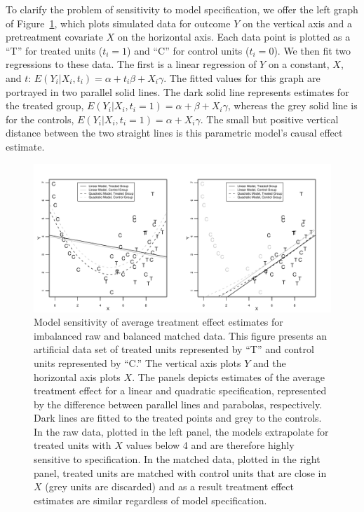 \documentclass[11pt,titlepage]{article}
\begin{document}
To clarify the problem of sensitivity to model specification, we offer
the left graph of Figure~\ref{fg:extrap}, which plots simulated data
for outcome $Y$ on the vertical axis and a pretreatment covariate $X$
on the horizontal axis.  Each data point is plotted as a ``T'' for
treated units ($t_i=1$) and ``C'' for control units ($t_i=0$).  We
then fit two regressions to these data.  The first is a linear
regression of $Y$ on a constant, $X$, and $t$: $E(Y_i|X_i,t_i)=\alpha
+ t_i\beta + X_i\gamma$.  The fitted values for this graph are
portrayed in two parallel solid lines.  The dark solid line represents
estimates for the treated group,
$E(Y_i|X_i,t_i=1)=\alpha+\beta+X_i\gamma$, whereas the grey solid line
is for the controls, $E(Y_i|X_i,t_i=1)=\alpha+X_i\gamma$. The small
but positive vertical distance between the two straight lines is this
parametric model's causal effect estimate.
\begin{figure}[t] 
 \begin{center}
   \includegraphics[width=6in]{figs/olspanel.pdf}
  \end{center}
  \vspace{-0.275in}
  \caption{Model sensitivity of average treatment effect estimates for
    imbalanced raw and balanced matched data.  This figure presents an
    artificial data set of treated units represented by ``T'' and
    control units represented by ``C.'' The vertical axis plots $Y$
    and the horizontal axis plots $X$.  The panels depicts estimates
    of the average treatment effect for a linear and quadratic
    specification, represented by the difference between parallel
    lines and parabolas, respectively.  Dark lines are fitted to the
    treated points and grey to the controls.  In the raw data, plotted
    in the left panel, the models extrapolate for treated units with
    $X$ values below 4 and are therefore highly sensitive to
    specification.  In the matched data, plotted in the right panel,
    treated units are matched with control units that are close in $X$
    (grey units are discarded) and as a result treatment effect
    estimates are similar regardless of model specification.}
  \label{fg:extrap}
\end{figure}
\end{document}
